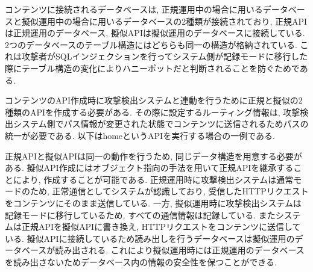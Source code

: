 \documentclass[submit,techrep,noauthor]{ipsj}
\begin{document}
コンテンツに接続されるデータベースは, 正規運用中の場合に用いるデータベースと擬似運用中の場合に用いるデータベースの2種類が接続されており, 正規APIは正規運用のデータベース, 擬似APIは擬似運用のデータベースに接続している. 2つのデータベースのテーブル構造にはどちらも同一の構造が格納されている. これは攻撃者がSQLインジェクションを行ってシステム側が記録モードに移行した際にテーブル構造の変化によりハニーポットだと判断されることを防ぐためである.\par
コンテンツのAPI作成時に攻撃検出システムと連動を行うために正規と擬似の2種類のAPIを作成する必要がある. その際に設定するルーティング情報は, 攻撃検出システム側でパス情報が変更された状態でコンテンツに送信されるためパスの統一が必要である. 以下はhomeというAPIを実行する場合の一例である.\par
正規APIと擬似APIは同一の動作を行うため, 同じデータ構造を用意する必要がある. 擬似API作成にはオブジェクト指向の手法を用いて正規APIを継承することにより, 作成することが可能である.
正規運用時に攻撃検出システムは通常モードのため, 正常通信としてシステムが認識しており, 受信したHTTPリクエストをコンテンツにそのまま送信している. 一方, 擬似運用時に攻撃検出システムは記録モードに移行しているため, すべての通信情報は記録している. またシステムは正規APIを擬似APIに書き換え, HTTPリクエストをコンテンツに送信している. 擬似APIに接続しているため読み出しを行うデータベースは擬似運用のデータベースが読み出される. これにより擬似運用時には正規運用のデータベースを読み出さないためデータベース内の情報の安全性を保つことができる.\par

\end{document}

